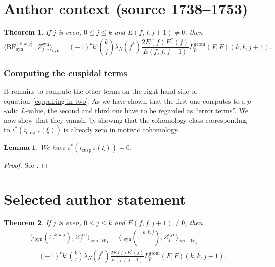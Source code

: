 \documentclass[10pt,a4paper]{amsart}
\newtheorem{theorem}{Theorem}
\newtheorem{lemma}{Lemma}
\newcommand{\BF}{\mathrm{BF}}
\newcommand{\KS}{\mathscr{W}}
\newcommand{\Lgeom}{L_p^{\mathrm{geom}}}
\newcommand{\cBF}{\Xi}
\newcommand{\lcBF}{\widetilde{\Xi}}
\renewcommand{\le}{\leqslant}
\renewcommand{\leq}{\le}
\newcommand{\regulator}[1]{r_{#1}}
\newcommand{\rsyn}{\regulator{\syn}}
\DeclareMathOperator{\syn}{syn}
\begin{document}
\section*{Author context (source 1738--1753)}
\begin{theorem}
    \label{thm:first-term}
    If $j$ is even, $0\leq j\leq k$ and $E(f,f,j+1)\neq 0$, then
    \[
        \langle \BF^{[k,k,j]}_{\syn},Z_{f,c}^{\syn}\rangle_{\syn} = (-1)^k k!\binom{k}{j}\lambda_N(f^*)\frac{2E(f)E^*(f)}{E(f,f,j+1)}\Lgeom(F,F)(k,k,j+1).
    \]
\end{theorem}

\subsubsection*{Computing the cuspidal terms}
It remains to compute the other terms on the right hand side of equation~\eqref{eq:pairing-in-two}. As we have shown that the first one computes to a $p$-adic $L$-value, the second and third one have to be regarded as ``error terms''. We now show that they vanish, by showing that the cohomology class corresponding to $\iota^*(i_{\mathrm{cusp},*}(\xi))$ is already zero in motivic cohomology.
\begin{lemma}
    \label{lemma:cuspidal-is-zero}
    We have $\iota^*(i_{\mathrm{cusp},*}(\xi)) = 0$.
\end{lemma}

\begin{proof} See \cite[Proposition~9.4]{brunaultchida16}.\end{proof}
\section*{Selected author statement}
\begin{theorem}
    If $j$ is even, $0\leq j\leq k$ and $E(f,f,j+1)\neq 0$, then
\begin{multline*}
    \langle \rsyn(\cBF^{k,k,j}),Z_f^{\syn} \rangle_{\syn, \KS_k} = \langle \rsyn(\lcBF^{k,k,j}),Z_f^{\syn} \rangle_{\syn, \KS_k} \\
 = (-1)^k k!\binom{k}{j}\lambda_N(f^*)\frac{2E(f)E^*(f)}{E(f,f,j+1)}\Lgeom(F,F)(k,k,j+1).
\end{multline*}
\end{theorem}
\end{document}
